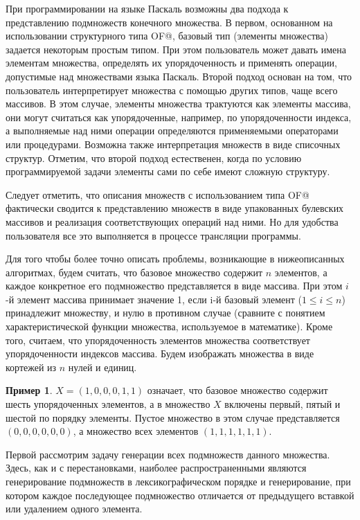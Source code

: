 \documentclass[12pt,a4paper]{article}
\theoremstyle{plain}
\theoremstyle{definition}
\newtheorem*{example}{Пример}
\theoremstyle{remark}
\begin{document}
При программировании на языке Паскаль возможны два подхода к представлению подмножеств конечного множества. В первом, основанном на использовании структурного типа \verb@SET OF@, базовый тип (элементы множества) задается некоторым простым типом. При этом пользователь может давать имена элементам множества, определять их упорядоченность и применять операции, допустимые над множествами языка Паскаль. Второй подход основан на том, что пользователь интерпретирует множества с помощью других типов, чаще всего массивов. В этом случае, элементы множества трактуются как элементы массива, они могут считаться как упорядоченные, например, по упорядоченности индекса, а выполняемые над ними операции определяются применяемыми операторами или процедурами. Возможна также интерпретация множеств в виде списочных структур. Отметим, что второй подход естественен, когда по условию программируемой задачи элементы сами по себе имеют сложную структуру.

Следует отметить, что описания множеств с использованием типа \verb@SET OF@ фактически сводится к представлению множеств в виде упакованных булевских массивов и реализация соответствующих операций над ними. Но для удобства пользователя все это выполняется в процессе трансляции программы.

Для того чтобы более точно описать проблемы, возникающие в нижеописанных алгоритмах, будем считать, что базовое множество содержит $n$ элементов, а каждое конкретное его подмножество представляется в виде массива. При этом $i$-й элемент массива принимает значение 1, если i-й базовый элемент ($1\le i\le n$) принадлежит множеству, и нулю в противном случае (сравните с понятием характеристической функции множества, используемое в математике). Кроме того, считаем, что упорядоченность элементов множества соответствует упорядоченности индексов массива. Будем изображать множества в виде кортежей из $n$ нулей и единиц. 

\begin{example}
$X=(1,0,0,0,1,1)$ означает, что базовое множество содержит шесть упорядоченных элементов, а в множество $X$ включены первый, пятый и шестой по порядку элементы. Пустое множество в этом случае представляется $(0,0,0,0,0,0)$, а множество всех элементов $(1,1,1,1,1,1)$.
\end{example}

Первой рассмотрим задачу генерации всех подмножеств данного множества. Здесь, как и с перестановками, наиболее распространенными являются генерирование подмножеств в лексикографическом порядке и генерирование, при котором каждое последующее подмножество отличается от предыдущего вставкой или удалением одного элемента.
\end{document}
